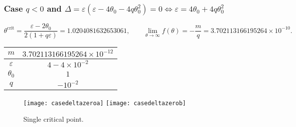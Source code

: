 \documentclass[
    8pt,
    aspectratio=1610,
    c,
    intlimits,
    leqno,
    professionalfonts,
]{beamer}
\begin{document}




\begin{frame}
	\frametitle{Case $q<0$ and
		\begin{math}
			\Delta=
			\varepsilon\left(\varepsilon-4\theta_{0}-4q\theta^{2}_{0}\right)=
			0\iff\varepsilon=4\theta_{0}+4q\theta^{2}_{0}
		\end{math}
	}

	\begin{equation*}
		\theta^{\text{crit}}=
		\frac{\varepsilon-2\theta_{0}}{2\left(1+q\varepsilon\right)}=
		1.0204081632653061,\qquad
		\lim_{\theta\to\infty}f\left(\theta\right)=
		-\frac{m}{q}=
		3.702113166195264\times 10^{-10}.
	\end{equation*}

	\begin{table}[ht!]
		\begin{tabular}{cc}
			\hline
			$m$           & $3.702113166195264\times 10^{-12}$ \\
			\hline
			$\varepsilon$ & $4-4\times 10^{-2}$                \\
			\hline
			$\theta_{0}$  & $1$                                \\
			\hline
			$q$           & $-10^{-2}$                         \\
			\hline
		\end{tabular}
	\end{table}

	\begin{figure}[ht!]
		\centering
		\texttt{[image: casedeltazeroa]}
		\texttt{[image: casedeltazerob]}
		\caption{Single critical point.}
	\end{figure}
\end{frame}
\end{document}
